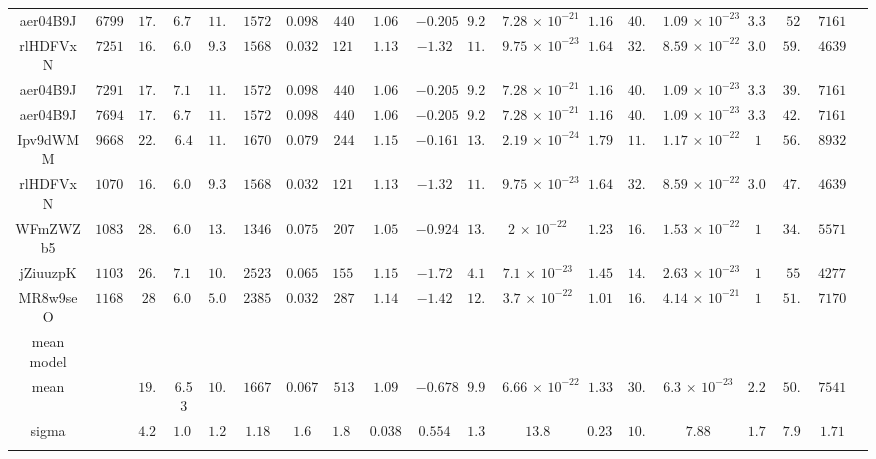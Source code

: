 \begin{appendix}
\begin{table}
\begin{tabular}{ccccccccccccccccccc}
aer04B9J & $ 6799$ & $ 17.1$ & $ 6.75$ & $ 11.5$ & $ 15720$ & $ 0.0981$ & $ 440$ & $ 1.06$ & $ -0.205$ & $ 9.29$ & $ 7.28\,{\times}\, 10^{-21}$ & $ 1.16$ & $ 40.4$ & $ 1.09\,{\times}\, 10^{-23}$ & $ 3.35$ & $ 52$ & $ 7161$ \\ 
rlHDFVxN & $ 7251$ & $ 16.6$ & $ 6.07$ & $ 9.32$ & $ 15680$ & $ 0.0321$ & $ 1216$ & $ 1.13$ & $ -1.32$ & $ 11.8$ & $ 9.75\,{\times}\, 10^{-23}$ & $ 1.64$ & $ 32.8$ & $ 8.59\,{\times}\, 10^{-22}$ & $ 3.05$ & $ 59.6$ & $ 4639$ \\ 
aer04B9J & $ 7291$ & $ 17.3$ & $ 7.11$ & $ 11.5$ & $ 15720$ & $ 0.0981$ & $ 440$ & $ 1.06$ & $ -0.205$ & $ 9.29$ & $ 7.28\,{\times}\, 10^{-21}$ & $ 1.16$ & $ 40.4$ & $ 1.09\,{\times}\, 10^{-23}$ & $ 3.35$ & $ 39.5$ & $ 7161$ \\ 
aer04B9J & $ 7694$ & $ 17.5$ & $ 6.75$ & $ 11.5$ & $ 15720$ & $ 0.0981$ & $ 440$ & $ 1.06$ & $ -0.205$ & $ 9.29$ & $ 7.28\,{\times}\, 10^{-21}$ & $ 1.16$ & $ 40.4$ & $ 1.09\,{\times}\, 10^{-23}$ & $ 3.35$ & $ 42.3$ & $ 7161$ \\ 
Ipv9dWMM & $ 9668$ & $ 22.7$ & $ 6.4$ & $ 11.4$ & $ 16700$ & $ 0.0795$ & $ 244$ & $ 1.15$ & $ -0.161$ & $ 13.2$ & $ 2.19\,{\times}\, 10^{-24}$ & $ 1.79$ & $ 11.4$ & $ 1.17\,{\times}\, 10^{-22}$ & $ 1$ & $ 56.7$ & $ 8932$ \\ 
rlHDFVxN & $ 10702$ & $ 16.8$ & $ 6.07$ & $ 9.32$ & $ 15680$ & $ 0.0321$ & $ 1216$ & $ 1.13$ & $ -1.32$ & $ 11.8$ & $ 9.75\,{\times}\, 10^{-23}$ & $ 1.64$ & $ 32.8$ & $ 8.59\,{\times}\, 10^{-22}$ & $ 3.05$ & $ 47.8$ & $ 4639$ \\ 
WFmZWZb5 & $ 10838$ & $ 28.6$ & $ 6.07$ & $ 13.9$ & $ 13460$ & $ 0.0754$ & $ 207$ & $ 1.05$ & $ -0.924$ & $ 13.6$ & $ 2\,{\times}\, 10^{-22}$ & $ 1.23$ & $ 16.9$ & $ 1.53\,{\times}\, 10^{-22}$ & $ 1$ & $ 34.8$ & $ 5571$ \\ 
jZiuuzpK & $ 11033$ & $ 26.3$ & $ 7.11$ & $ 10.9$ & $ 25230$ & $ 0.0653$ & $ 1559$ & $ 1.15$ & $ -1.72$ & $ 4.11$ & $ 7.1\,{\times}\, 10^{-23}$ & $ 1.45$ & $ 14.4$ & $ 2.63\,{\times}\, 10^{-23}$ & $ 1$ & $ 55$ & $ 42775$ \\ 
MR8w9seO & $ 11686$ & $ 28$ & $ 6.07$ & $ 5.01$ & $ 23850$ & $ 0.0321$ & $ 287$ & $ 1.14$ & $ -1.42$ & $ 12.4$ & $ 3.7\,{\times}\, 10^{-22}$ & $ 1.01$ & $ 16.7$ & $ 4.14\,{\times}\, 10^{-21}$ & $ 1$ & $ 51.8$ & $ 7170$ \\ 
\noalign{\smallskip} 
\hline 
mean model \\
\noalign{\smallskip} 
\hline 
\noalign{\smallskip} 
mean & & $ 19.9$ & 6.53 & $ 10.5$ & $ 16672$ & $ 0.0679$ & $ 513$ & $ 1.09$ & $ -0.678$ & $ 9.91$ & $ 6.66\,{\times}\, 10^{-22}$ & $ 1.33$ & $ 30.9$ & $ 6.3\,{\times}\, 10^{-23}$ & $ 2.25$ & $ 50.6$ & $ 7541$ \\ 
sigma & &$ 4.28$ &$ 1.06$ & $ 1.26$ &$ 1.18$ &$ 1.6$ &$ 1.86$ &$ 0.0389$ &$ 0.554$ &$ 1.34$ &$ 13.8$ &$ 0.233$ &$ 10.7$ &$ 7.88$ &$ 1.73$ &$ 7.95$ &$ 1.71$ \\ 
\noalign{\smallskip} 
\hline 
\end{tabular} 
\end{table}
\clearpage


\end{appendix}
